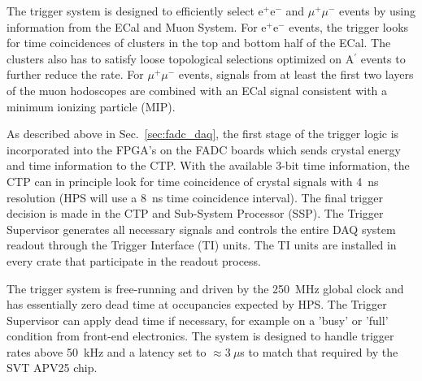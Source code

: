 

The trigger system is designed to efficiently select e$^{+}$e$^{-}$ and $\mu^{+}\mu^{-}$ events by 
using information from the ECal and Muon System. For e$^{+}$e$^{-}$ events, the trigger looks for time coincidences of clusters in the top and bottom half of the ECal. The clusters also has to satisfy loose topological selections optimized on A$^{\prime}$ events to further reduce the rate. For $\mu^{+}\mu^{-}$ events, signals from at least the first two layers of the muon hodoscopes are combined with an ECal signal consistent with a minimum ionizing particle (MIP). 

As described above in Sec.~\ref{sec:fadc_daq}, the first stage of the trigger logic is incorporated into the FPGA's on the FADC boards which sends crystal energy and time information to the CTP. With the available 3-bit time information, the CTP can in principle look for time coincidence of crystal signals with 4~ns resolution (HPS will use a 8~ns time coincidence interval). The final trigger decision is made in the CTP and Sub-System Processor (SSP). The Trigger Supervisor generates all necessary signals and controls the entire DAQ system readout through the Trigger Interface (TI) units. The TI units are installed in every crate that participate in the readout process. 

The trigger system is free-running and driven by the 250~MHz global clock and has essentially zero dead time at occupancies expected by HPS. The Trigger Supervisor can apply dead time if necessary, for example on a 'busy' or 'full' condition from front-end electronics. The system is designed to handle trigger rates above 50~kHz and a latency set to $\approx 3~\mu$s to match that required by the SVT APV25 chip. 


 




